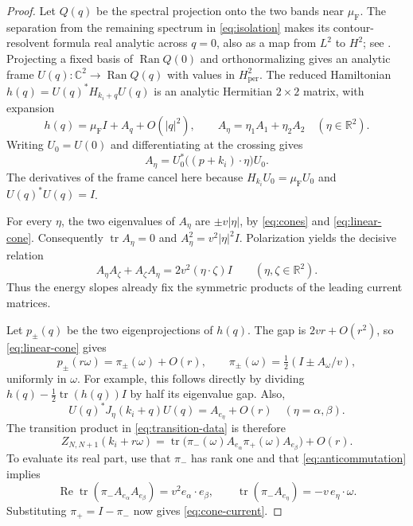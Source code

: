 \documentclass[11pt,a4paper]{article}
\newcommand{\R}{\mathbb R}
\newcommand{\C}{\mathbb C}
\DeclareMathOperator{\tr}{tr}
\DeclareMathOperator{\Ran}{Ran}
\DeclareMathOperator{\Rea}{Re}
\theoremstyle{remark}
\numberwithin{equation}{section}
\begin{document}
\begin{proof}
Let $Q(q)$ be the spectral projection onto the two bands near
$\mu_{\mathrm F}$. The separation from the remaining spectrum in
\eqref{eq:isolation} makes its contour-resolvent formula real analytic
across $q=0$, also as a map from $L^2$ to $H^2$;
see \cite[Section XII.2]{RS4}. Projecting a fixed basis of $\Ran Q(0)$
and orthonormalizing gives an analytic frame
$U(q):\C^2\to\Ran Q(q)$ with values in $H^2_{\mathrm{per}}$.
The reduced Hamiltonian $h(q)=U(q)^*H_{k_i+q}U(q)$ is an analytic
Hermitian $2\times2$ matrix, with expansion
\begin{equation}
 h(q)=\mu_{\mathrm F}I+A_q+O(|q|^2),\qquad
 A_\eta=\eta_1A_1+\eta_2A_2\quad(\eta\in\R^2).
 \label{eq:linear-cone}
\end{equation}
Writing $U_0=U(0)$ and differentiating at the crossing gives
\begin{equation}
 A_\eta=U_0^*\bigl((p+k_i)\cdot\eta\bigr)U_0.
 \label{eq:compressed-current}
\end{equation}
The derivatives of the frame cancel here because
$H_{k_i}U_0=\mu_{\mathrm F}U_0$ and $U(q)^*U(q)=I$.

For every $\eta$, the two eigenvalues of $A_\eta$ are
$\pm v|\eta|$, by \eqref{eq:cones} and \eqref{eq:linear-cone}.
Consequently $\tr A_\eta=0$ and $A_\eta^2=v^2|\eta|^2I$.
Polarization yields the decisive relation
\begin{equation}
 A_\eta A_\zeta+A_\zeta A_\eta
 =2v^2(\eta\cdot\zeta)I
 \qquad(\eta,\zeta\in\R^2).
 \label{eq:anticommutation}
\end{equation}
Thus the energy slopes already fix the symmetric products of the
leading current matrices.

Let $p_\pm(q)$ be the two eigenprojections of $h(q)$.
The gap is $2vr+O(r^2)$, so \eqref{eq:linear-cone} gives
\begin{equation}
 p_\pm(r\omega)=\pi_\pm(\omega)+O(r),\qquad
 \pi_\pm(\omega)=\tfrac12(I\pm A_\omega/v),
 \label{eq:cone-projectors}
\end{equation}
uniformly in $\omega$. For example, this follows directly by dividing
$h(q)-\tfrac12\tr(h(q))I$ by half its eigenvalue gap.
Also,
\[
 U(q)^*J_\eta(k_i+q)U(q)=A_{e_\eta}+O(r)
 \quad(\eta=\alpha,\beta).
\]
The transition product in \eqref{eq:transition-data} is therefore
\[
 Z_{N,N+1}(k_i+r\omega)
 =\tr\bigl(\pi_-(\omega)A_{e_\alpha}
                 \pi_+(\omega)A_{e_\beta}\bigr)+O(r).
\]
To evaluate its real part, use that $\pi_-$ has rank one and that
\eqref{eq:anticommutation} implies
\[
 \Rea\tr(\pi_-A_{e_\alpha}A_{e_\beta})
       =v^2 e_\alpha\cdot e_\beta,
 \qquad
 \tr(\pi_-A_{e_\eta})=-v\,e_\eta\cdot\omega.
\]
Substituting $\pi_+=I-\pi_-$ now gives
\eqref{eq:cone-current}.
\end{proof}
\end{document}
